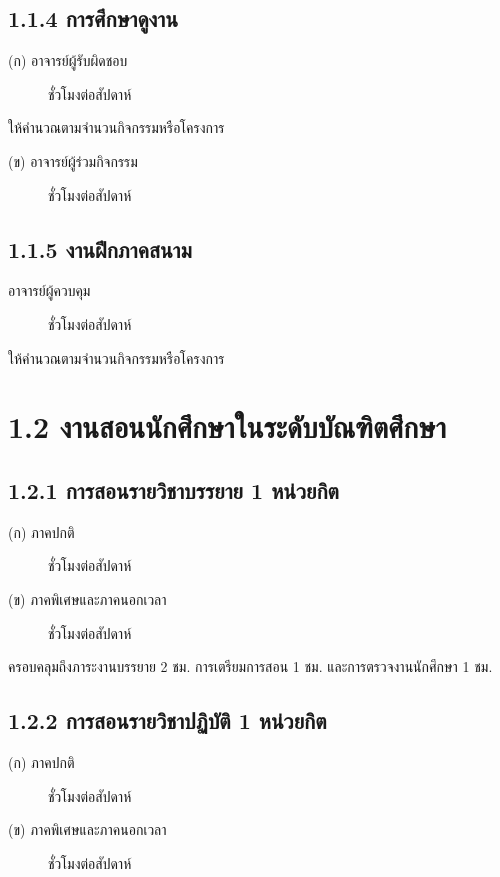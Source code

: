 \documentclass[a4paper,12pt,english]{sphinxmanual}
\begin{document}
\subsection{1.1.4 การศึกษาดูงาน}
\label{\detokenize{1teaching:id6}}\begin{description}
\item[{(ก) อาจารย์ผู้รับผิดชอบ}]  ชั่วโมงต่อสัปดาห์

\end{description}

ให้คำนวณตามจำนวนกิจกรรมหรือโครงการ
\begin{description}
\item[{(ข) อาจารย์ผู้ร่วมกิจกรรม}]  ชั่วโมงต่อสัปดาห์

\end{description}


\subsection{1.1.5 งานฝึกภาคสนาม}
\label{\detokenize{1teaching:id7}}\begin{description}
\item[{อาจารย์ผู้ควบคุม}]  ชั่วโมงต่อสัปดาห์

\end{description}

ให้คำนวณตามจำนวนกิจกรรมหรือโครงการ


\section{1.2 งานสอนนักศึกษาในระดับบัณฑิตศึกษา}
\label{\detokenize{1teaching:id8}}

\subsection{1.2.1 การสอนรายวิชาบรรยาย 1 หน่วยกิต}
\label{\detokenize{1teaching:id9}}\begin{description}
\item[{(ก) ภาคปกติ}]  ชั่วโมงต่อสัปดาห์

\item[{(ข) ภาคพิเศษและภาคนอกเวลา}]  ชั่วโมงต่อสัปดาห์

\end{description}

ครอบคลุมถึงภาระงานบรรยาย 2 ชม. การเตรียมการสอน 1 ชม. และการตรวจงานนักศึกษา 1 ชม.


\subsection{1.2.2 การสอนรายวิชาปฏิบัติ 1 หน่วยกิต}
\label{\detokenize{1teaching:id10}}\begin{description}
\item[{(ก) ภาคปกติ}]  ชั่วโมงต่อสัปดาห์

\item[{(ข) ภาคพิเศษและภาคนอกเวลา}]  ชั่วโมงต่อสัปดาห์

\end{description}
\end{document}
